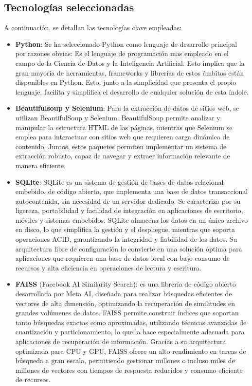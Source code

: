\subsection{Tecnologías seleccionadas}

A continuación, se detallan las tecnologías clave empleadas:

\begin{itemize}
    \item \textbf{Python}: Se ha seleccionado Python como lenguaje de desarrollo principal por razones obvias: Es el lenguaje de programación mas empleado en el campo de la Ciencia de Datos y la Inteligencia Artificial. Esto implica que la gran mayoría de herramientas, frameworks y librerías de estos ámbitos están disponibles en Python. Esto, junto a la simplicidad que presenta el propio lenguaje, facilita y simplifica el desarrollo de cualquier solución de esta índole.
    
    \item \textbf{Beautifulsoup y Selenium}: Para la extracción de datos de sitios web, se utilizan BeautifulSoup y Selenium. 
    BeautifulSoup permite analizar y manipular la estructura HTML de las páginas, mientras que Selenium se emplea para interactuar con sitios web que requieren carga dinámica de contenido. 
    Juntos, estos paquetes permiten implementar un sistema de extracción robusto, capaz de navegar y extraer información relevante de manera eficiente.
    
    \item \textbf{SQLite}: SQLite es un sistema de gestión de bases de datos relacional embebido, de código abierto, que implementa una base de datos transaccional autocontenida, sin necesidad de un servidor dedicado. 
    Se caracteriza por su ligereza, portabilidad y facilidad de integración en aplicaciones de escritorio, móviles y sistemas embebidos. 
    SQLite almacena los datos en un único archivo en disco, lo que simplifica la gestión y el despliegue, mientras que soporta operaciones ACID, garantizando la integridad y fiabilidad de los datos. 
    Su arquitectura libre de configuración lo convierte en una solución óptima para aplicaciones que requieren una base de datos local con bajo consumo de recursos y alta eficiencia en operaciones de lectura y escritura.
    
    \item \textbf{FAISS} (Facebook AI Similarity Search): es una librería de código abierto desarrollada por Meta AI, diseñada para realizar búsquedas eficientes de vectores de alta dimensión, optimizando la recuperación de similitudes en grandes volúmenes de datos. 
    FAISS permite construir índices que soportan tanto búsquedas exactas como aproximadas, utilizando técnicas avanzadas de cuantización y particionamiento, lo que la hace especialmente adecuada para aplicaciones de recuperación de información. 
    Gracias a su arquitectura optimizada para CPU y GPU, FAISS ofrece un alto rendimiento en tareas de búsqueda a gran escala, permitiendo gestionar millones o incluso miles de millones de vectores con tiempos de respuesta reducidos y consumo eficiente de recursos.
    

\end{itemize}
